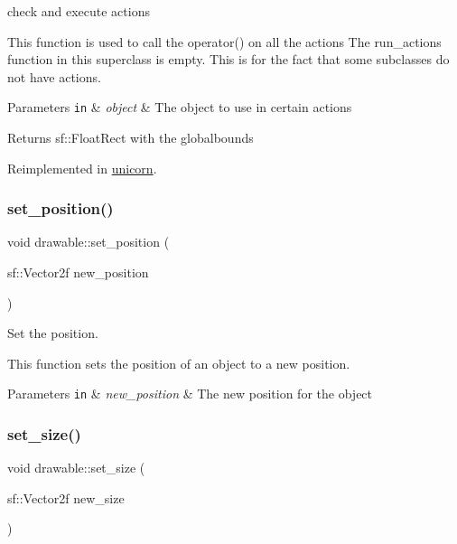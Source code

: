 check and execute actions 

This function is used to call the operator() on all the actions The run\+\_\+actions function in this superclass is empty. This is for the fact that some subclasses do not have actions. 
\begin{DoxyParams}[1]{Parameters}
\mbox{\tt in}  & {\em object} & The object to use in certain actions \\
\hline
\end{DoxyParams}
\begin{DoxyReturn}{Returns}
sf\+::\+Float\+Rect with the globalbounds 
\end{DoxyReturn}


Reimplemented in \hyperlink{classunicorn_aadb47a9981c46d6add8704074df117df}{unicorn}.

\mbox{\label{classdrawable_a5e40f2621daaca4ac32ef26b8c01b9a6}} 
\subsubsection{\texorpdfstring{set\+\_\+position()}{set\_position()}}
{\footnotesize\ttfamily void drawable\+::set\+\_\+position (\begin{DoxyParamCaption}\item[{sf\+::\+Vector2f}]{new\+\_\+position }\end{DoxyParamCaption})}



Set the position. 

This function sets the position of an object to a new position.


\begin{DoxyParams}[1]{Parameters}
\mbox{\tt in}  & {\em new\+\_\+position} & The new position for the object \\
\hline
\end{DoxyParams}
\mbox{\label{classdrawable_a34b6b50f342c41f550f09e0465f95f61}} 
\subsubsection{\texorpdfstring{set\+\_\+size()}{set\_size()}}
{\footnotesize\ttfamily void drawable\+::set\+\_\+size (\begin{DoxyParamCaption}\item[{sf\+::\+Vector2f}]{new\+\_\+size }\end{DoxyParamCaption})}



